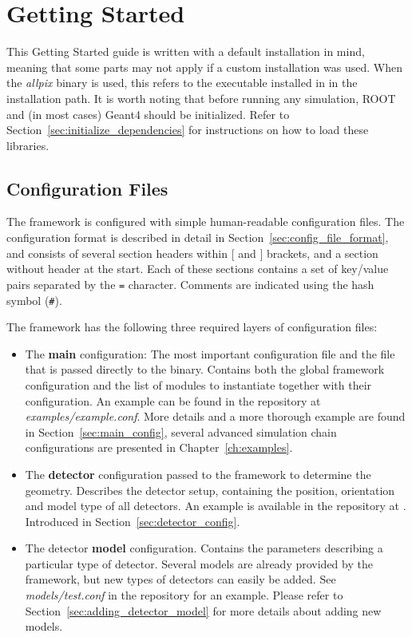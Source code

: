 \chapter{Getting Started}
\label{ch:gettingstarted}

This Getting Started guide is written with a default installation in mind, meaning that some parts may not apply if a custom installation was used.
When the \textit{allpix} binary is used, this refers to the executable installed in  in the installation path.
It is worth noting that before running any \apsq simulation, ROOT and (in most cases) Geant4 should be initialized.
Refer to Section~\ref{sec:initialize_dependencies} for instructions on how to load these libraries.

\section{Configuration Files}
\label{sec:configuration_files}
The framework is configured with simple human-readable configuration files.
The configuration format is described in detail in Section~\ref{sec:config_file_format}, and consists of several section headers within $[$ and $]$ brackets, and a section without header at the start.
Each of these sections contains a set of key/value pairs separated by the \texttt{=} character.
Comments are indicated using the hash symbol (\texttt{\#}).

The framework has the following three required layers of configuration files:
\begin{itemize}
\item The \textbf{main} configuration: The most important configuration file and the file that is passed directly to the binary.
Contains both the global framework configuration and the list of modules to instantiate together with their configuration.
An example can be found in the repository at \textit{examples/example.conf}.
More details and a more thorough example are found in Section~\ref{sec:main_config}, several advanced simulation chain configurations are presented in Chapter~\ref{ch:examples}.
\item The \textbf{detector} configuration passed to the framework to determine the geometry.
Describes the detector setup, containing the position, orientation and model type of all detectors.
An example is available in the repository at .
Introduced in Section~\ref{sec:detector_config}.
\item The detector \textbf{model} configuration.
Contains the parameters describing a particular type of detector.
Several models are already provided by the framework, but new types of detectors can easily be added.
See \textit{models/test.conf} in the repository for an example.
Please refer to Section~\ref{sec:adding_detector_model} for more details about adding new models.
\end{itemize}

